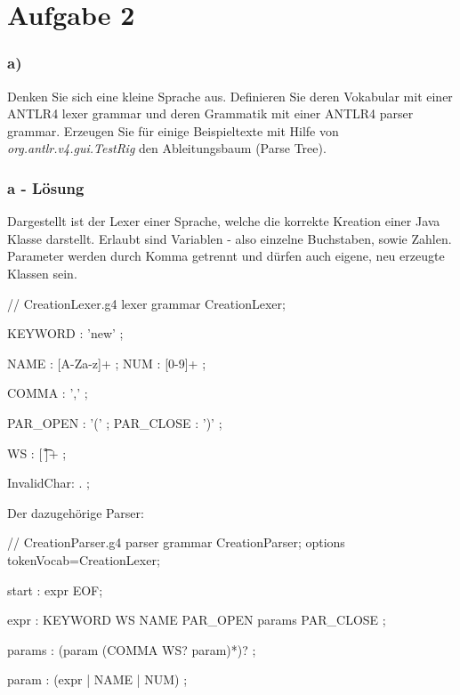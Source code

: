 \chapter{Aufgabe 2}
\label{sec:aufgabe2}

\subsection*{a)}
Denken Sie sich eine kleine Sprache aus.
Definieren Sie deren Vokabular mit einer ANTLR4 lexer grammar und deren Grammatik mit einer ANTLR4 parser grammar.
Erzeugen Sie für einige Beispieltexte mit Hilfe von \textit{org.antlr.v4.gui.TestRig} den Ableitungsbaum (Parse Tree).

\subsection*{a - Lösung}
Dargestellt ist der Lexer einer Sprache, welche die korrekte Kreation einer Java Klasse darstellt.
Erlaubt sind Variablen - also einzelne Buchstaben, sowie Zahlen.
Parameter werden durch Komma getrennt und dürfen auch eigene, neu erzeugte Klassen sein.
\newline
\begin{code}[language=antlr, caption={Lexer Grammar} ,label={lst:Aufgabe2a_lexer}]
    // CreationLexer.g4
    lexer grammar CreationLexer;

    KEYWORD : 'new' ;

    NAME : [A-Za-z]+ ;
    NUM : [0-9]+ ;

    COMMA : ',' ;

    PAR_OPEN : '(' ;
    PAR_CLOSE : ')' ;

    WS : [ \t\r\n]+ ;

    InvalidChar: . ;
\end{code}

\newpage

Der dazugehörige Parser:
\begin{code}[language=antlr, caption={Parser Grammar}, label={lst:Aufgabe2a_parser}]
    // CreationParser.g4
    parser grammar CreationParser;
    options { tokenVocab=CreationLexer; }

    start : expr EOF;

    expr : KEYWORD WS NAME PAR_OPEN params PAR_CLOSE ;

    params : (param (COMMA WS? param)*)? ;

    param : (expr | NAME | NUM) ;
\end{code}
\newline

